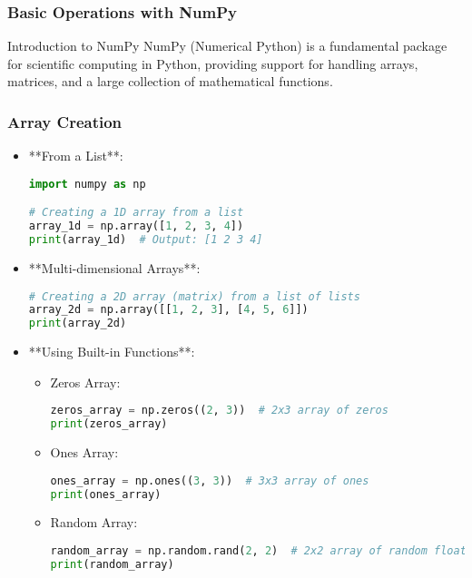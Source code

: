 \documentclass[aspectratio=169]{beamer}
\begin{document}
\begin{frame}[fragile]
    \frametitle{Basic Operations with NumPy}
    \begin{block}{Introduction to NumPy}
        NumPy (Numerical Python) is a fundamental package for scientific computing in Python, providing support for handling arrays, matrices, and a large collection of mathematical functions.
    \end{block}
\end{frame}

\begin{frame}[fragile]
    \frametitle{Array Creation}
    \begin{itemize}
        \item **From a List**:
        \begin{lstlisting}[language=Python]
import numpy as np

# Creating a 1D array from a list
array_1d = np.array([1, 2, 3, 4])
print(array_1d)  # Output: [1 2 3 4]
        \end{lstlisting}
        
        \item **Multi-dimensional Arrays**:
        \begin{lstlisting}[language=Python]
# Creating a 2D array (matrix) from a list of lists
array_2d = np.array([[1, 2, 3], [4, 5, 6]])
print(array_2d)
        \end{lstlisting}
        
        \item **Using Built-in Functions**:
        \begin{itemize}
            \item Zeros Array:
            \begin{lstlisting}[language=Python]
zeros_array = np.zeros((2, 3))  # 2x3 array of zeros
print(zeros_array)
            \end{lstlisting}
            \item Ones Array:
            \begin{lstlisting}[language=Python]
ones_array = np.ones((3, 3))  # 3x3 array of ones
print(ones_array)
            \end{lstlisting}
            \item Random Array:
            \begin{lstlisting}[language=Python]
random_array = np.random.rand(2, 2)  # 2x2 array of random floats
print(random_array)
            \end{lstlisting}
        \end{itemize}
    \end{itemize}
\end{frame}
\end{document}
